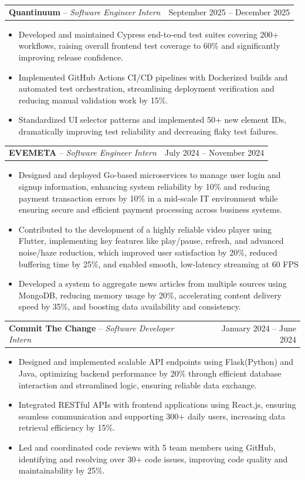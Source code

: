 \documentclass[letterpaper,11pt]{article}
\makeatletter
\newcommand{\resumeItem}[1]{
  \item\small{
    {#1 \vspace{-2pt}}
  }
}
\newcommand{\experienceSubheading}[3]{
  \vspace{-2pt}\item
  \begin{tabular*}{0.97\textwidth}[t]{l@{\extracolsep{\fill}}r}
    \textbf{#1} -- \textit{#2} & #3 \\
  \end{tabular*}\vspace{-7pt}
}
\newcommand{\resumeItemListStart}{\begin{itemize}}
\newcommand{\resumeItemListEnd}{\end{itemize}\vspace{-5pt}}
\makeatother
\begin{document}
    \experienceSubheading
    {Quantinuum}{Software Engineer Intern}{September 2025 -- December 2025}
      \resumeItemListStart
      \resumeItem{Developed and maintained Cypress end-to-end test suites covering 200+ workflows, raising overall frontend test coverage to 60\% and significantly improving release confidence.}
      \resumeItem{Implemented GitHub Actions CI/CD pipelines with Dockerized builds and automated test orchestration, streamlining deployment verification and reducing manual validation work by 15\%.}
      \resumeItem{Standardized UI selector patterns and implemented 50+ new element IDs, dramatically improving test reliability and decreasing flaky test failures.}
    \resumeItemListEnd

    \experienceSubheading
    {EVEMETA}{Software Engineer Intern}{July 2024 -- November 2024}
      \resumeItemListStart
      \resumeItem{Designed and deployed Go-based microservices to manage user login and signup information, enhancing system reliability by 10\%
                    and reducing payment transaction errors by 10\% in a mid-scale IT environment while ensuring secure and efficient payment processing 
                    across business systems.}
      \resumeItem{Contributed to the development of a highly reliable video player using Flutter, implementing key features like
                    play/pause, refresh, and advanced noise/haze reduction, which improved user satisfaction by 20\%, reduced
                    buffering time by 25\%, and enabled smooth, low-latency streaming at 60 FPS}
      \resumeItem{Developed a system to aggregate news articles from multiple sources using MongoDB, reducing memory usage
                    by 20\%, accelerating content delivery speed by 35\%, and boosting data availability and consistency.}
    \resumeItemListEnd

    \experienceSubheading
    {Commit The Change}{Software Developer Intern}{January 2024 -- June 2024}
      \resumeItemListStart
        \resumeItem{Designed and implemented scalable API endpoints using Flask(Python) and Java, optimizing backend
                        performance by 20\% through efficient database interaction and streamlined logic, ensuring reliable data exchange.}
        \resumeItem{Integrated RESTful APIs with frontend applications using React.js, ensuring seamless communication and
                        supporting 300+ daily users, increasing data retrieval efficiency by 15\%.}
        \resumeItem{Led and coordinated code reviews with 5 team members using GitHub, identifying and resolving over 30+
                        code issues, improving code quality and maintainability by 25\%.}
    \resumeItemListEnd
\end{document}
